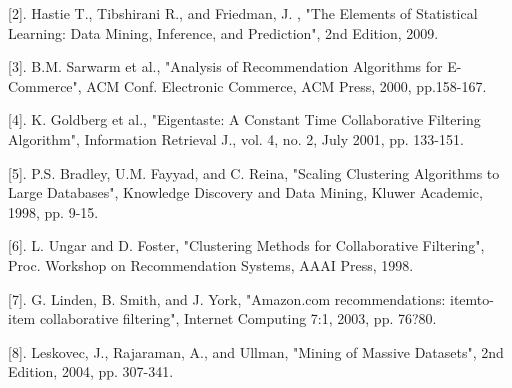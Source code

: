 \documentclass{sig-alternate-05-2015}
\begin{document}
[2]. Hastie T., Tibshirani R., and Friedman, J. , "The Elements of Statistical Learning: Data Mining, Inference, and Prediction", 2nd Edition, 2009.

[3]. B.M. Sarwarm et al., "Analysis of Recommendation Algorithms for E-Commerce", ACM Conf. Electronic Commerce, ACM Press, 2000, pp.158-167.

[4]. K. Goldberg et al., "Eigentaste: A Constant Time Collaborative Filtering Algorithm", Information Retrieval J., vol. 4, no. 2, July 2001, pp. 133-151.

[5]. P.S. Bradley, U.M. Fayyad, and C. Reina, "Scaling Clustering Algorithms to Large Databases", Knowledge Discovery and Data Mining, Kluwer Academic, 1998, pp. 9-15.

[6]. L. Ungar and D. Foster, "Clustering Methods for Collaborative Filtering", Proc. Workshop on Recommendation Systems, AAAI Press, 1998.

[7]. G. Linden, B. Smith, and J. York, "Amazon.com recommendations: itemto-item collaborative filtering", Internet Computing 7:1, 2003, pp. 76?80.

[8]. Leskovec, J., Rajaraman, A., and Ullman, "Mining of Massive Datasets", 2nd Edition, 2004, pp. 307-341.
\end{document}
